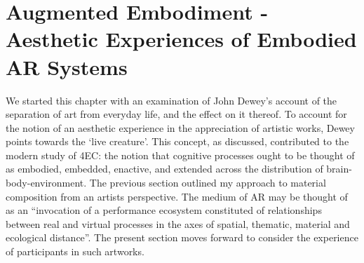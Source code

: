 \section[Augmented Embodiment]{Augmented Embodiment - Aesthetic Experiences of Embodied AR Systems}
We started this chapter with an examination of John Dewey’s account of the separation of art from everyday life, and the effect on it thereof. To account for the notion of an aesthetic experience in the appreciation of artistic works, Dewey points towards the ‘live creature’. This concept, as discussed, contributed to the modern study of 4EC: the notion that cognitive processes ought to be thought of as embodied, embedded, enactive, and extended across the distribution of brain-body-environment. The previous section outlined my approach to material composition from an artists perspective. The medium of AR may be thought of as an “invocation of a performance ecosystem constituted of relationships between real and virtual processes in the axes of spatial, thematic, material and ecological distance”. The present section moves forward to consider the experience of participants in such artworks.

